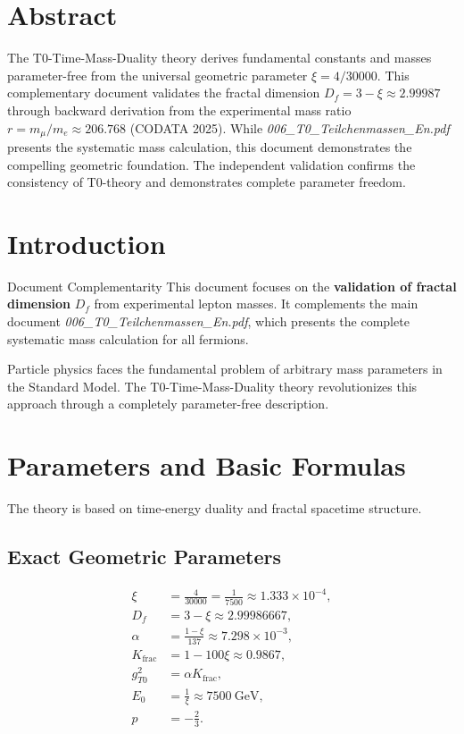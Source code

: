 \section*{Abstract}
		The T0-Time-Mass-Duality theory derives fundamental constants and masses parameter-free from the universal geometric parameter $\xi = 4/30000$. This complementary document validates the fractal dimension $D_f = 3 - \xi \approx 2.99987$ through backward derivation from the experimental mass ratio $r = m_{\mu} / m_e \approx 206.768$ (CODATA 2025). While \emph{006\_T0\_Teilchenmassen\_En.pdf} presents the systematic mass calculation, this document demonstrates the compelling geometric foundation. The independent validation confirms the consistency of T0-theory and demonstrates complete parameter freedom.

	
	
	
	\section{Introduction}
	\label{sec:introduction}
	
	\begin{important}{Document Complementarity}{}
		This document focuses on the \textbf{validation of fractal dimension} $D_f$ from experimental lepton masses. It complements the main document \emph{006\_T0\_Teilchenmassen\_En.pdf}, which presents the complete systematic mass calculation for all fermions.
	\end{important}
	
	Particle physics faces the fundamental problem of arbitrary mass parameters in the Standard Model. The T0-Time-Mass-Duality theory revolutionizes this approach through a completely parameter-free description.
	
	\section{Parameters and Basic Formulas}
	\label{sec:parameters}
	
	The theory is based on time-energy duality and fractal spacetime structure.
	
	\subsection{Exact Geometric Parameters}
	\label{subsec:exact_parameters}
	
	\begin{align}
		\xi &= \frac{4}{30000} = \frac{1}{7500} \approx 1.333 \times 10^{-4}, \label{eq:xi} \\
		D_f &= 3 - \xi \approx 2.99986667, \label{eq:Df} \\
		\alpha &= \frac{1 - \xi}{137} \approx 7.298 \times 10^{-3}, \label{eq:alpha} \\
		K_{\text{frac}} &= 1 - 100 \xi \approx 0.9867, \label{eq:K} \\
		g_{T0}^2 &= \alpha K_{\text{frac}}, \label{eq:gT0} \\
		E_0 &= \frac{1}{\xi} \approx \SI{7500}{\giga\electronvolt}, \label{eq:E0} \\
		p &= -\frac{2}{3}. \label{eq:p}
	\end{align}
	
